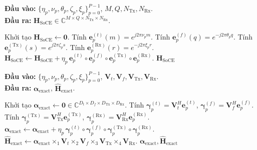 \begin{algorithm}[H]
\caption{Tính kênh tham chiếu bằng SoCE trực tiếp}
\label{alg:ch3_soce_direct}
\textbf{Đầu vào:} \(\{\eta_p,\nu_p,\theta_p,\zeta_p,\xi_p\}_{p=0}^{P-1}\), \(M,Q,N_{\mathrm{Tx}},N_{\mathrm{Rx}}\).\\
\textbf{Đầu ra:} \(\mathbf{H}_{\mathrm{SoCE}}\in\mathbb{C}^{M\times Q\times N_{\mathrm{Tx}}\times N_{\mathrm{Rx}}}\).
\begin{algorithmic}[1]
\State Khởi tạo \(\mathbf{H}_{\mathrm{SoCE}}\gets\mathbf{0}\).
    \State Tính \(\mathbf{e}^{(t)}_p(m)=e^{j2\pi\nu_p m}\).
    \State Tính \(\mathbf{e}^{(f)}_p(q)=e^{-j2\pi\theta_p q}\).
    \State Tính \(\mathbf{e}^{(\mathrm{Tx})}_p(s)=e^{j2\pi\zeta_p s}\).
    \State Tính \(\mathbf{e}^{(\mathrm{Rx})}_p(r)=e^{-j2\pi\xi_p r}\).
    \State \(\mathbf{H}_{\mathrm{SoCE}}\gets\mathbf{H}_{\mathrm{SoCE}}
    +\eta_p\,\mathbf{e}^{(t)}_p\circ\mathbf{e}^{(f)}_p
    \circ\mathbf{e}^{(\mathrm{Tx})}_p\circ\mathbf{e}^{(\mathrm{Rx})}_p\).
\EndFor
\State \Return \(\mathbf{H}_{\mathrm{SoCE}}\)
\end{algorithmic}
\end{algorithm}

\begin{algorithm}[H]
\caption{Chiếu DPS chính xác}
\label{alg:ch3_exact_dps}
\textbf{Đầu vào:} \(\{\eta_p,\nu_p,\theta_p,\zeta_p,\xi_p\}_{p=0}^{P-1}\), \(\mathbf{V}_t,\mathbf{V}_f,\mathbf{V}_{\mathrm{Tx}},\mathbf{V}_{\mathrm{Rx}}\).\\
\textbf{Đầu ra:} \(\boldsymbol{\alpha}_{\mathrm{exact}}\), \(\widehat{\mathbf{H}}_{\mathrm{exact}}\).
\begin{algorithmic}[1]
\State Khởi tạo \(\boldsymbol{\alpha}_{\mathrm{exact}}\gets\mathbf{0}\in
\mathbb{C}^{D_t\times D_f\times D_{\mathrm{Tx}}\times D_{\mathrm{Rx}}}\).
    \State Tính \(\boldsymbol{\gamma}^{(t)}_p=\mathbf{V}_t^H\mathbf{e}^{(t)}_p\), \(\boldsymbol{\gamma}^{(f)}_p=\mathbf{V}_f^H\mathbf{e}^{(f)}_p\).
    \State Tính \(\boldsymbol{\gamma}^{(\mathrm{Tx})}_p=\mathbf{V}_{\mathrm{Tx}}^H\mathbf{e}^{(\mathrm{Tx})}_p\), \(\boldsymbol{\gamma}^{(\mathrm{Rx})}_p=\mathbf{V}_{\mathrm{Rx}}^H\mathbf{e}^{(\mathrm{Rx})}_p\).
    \State \(\boldsymbol{\alpha}_{\mathrm{exact}}\gets\boldsymbol{\alpha}_{\mathrm{exact}}+\eta_p\,
    \boldsymbol{\gamma}^{(t)}_p\circ\boldsymbol{\gamma}^{(f)}_p
    \circ\boldsymbol{\gamma}^{(\mathrm{Tx})}_p
    \circ\boldsymbol{\gamma}^{(\mathrm{Rx})}_p\).
\EndFor
\State \(\widehat{\mathbf{H}}_{\mathrm{exact}}\gets
\boldsymbol{\alpha}_{\mathrm{exact}}
\times_1\mathbf{V}_t
\times_2\mathbf{V}_f
\times_3\mathbf{V}_{\mathrm{Tx}}
\times_4\mathbf{V}_{\mathrm{Rx}}\).
\State \Return \(\boldsymbol{\alpha}_{\mathrm{exact}},\widehat{\mathbf{H}}_{\mathrm{exact}}\)
\end{algorithmic}
\end{algorithm}

